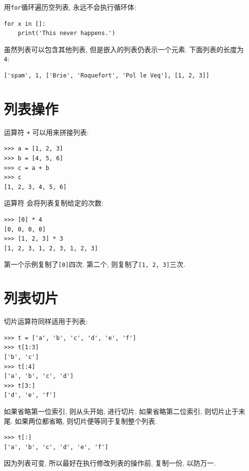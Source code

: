 \documentclass[10pt]{book}
\begin{document}
用{\tt for}循环遍历空列表, 永远不会执行循环体:

\begin{verbatim}
for x in []:
    print('This never happens.')
\end{verbatim}
%
虽然列表可以包含其他列表, 但是嵌入的列表仍表示一个元素. 
下面列表的长度为{\tt 4}:

\begin{verbatim}
['spam', 1, ['Brie', 'Roquefort', 'Pol le Veq'], [1, 2, 3]]
\end{verbatim}



\section{列表操作}

运算符 {\tt +} 可以用来拼接列表:

\begin{verbatim}
>>> a = [1, 2, 3]
>>> b = [4, 5, 6]
>>> c = a + b
>>> c
[1, 2, 3, 4, 5, 6]
\end{verbatim}
%

运算符 {\tt *} 会将列表复制给定的次数:

\begin{verbatim}
>>> [0] * 4
[0, 0, 0, 0]
>>> [1, 2, 3] * 3
[1, 2, 3, 1, 2, 3, 1, 2, 3]
\end{verbatim}
%
第一个示例复制了{\tt [0]}四次. 
第二个, 则复制了{\tt [1, 2, 3]}三次. 


\section{列表切片}

切片运算符同样适用于列表:

\begin{verbatim}
>>> t = ['a', 'b', 'c', 'd', 'e', 'f']
>>> t[1:3]
['b', 'c']
>>> t[:4]
['a', 'b', 'c', 'd']
>>> t[3:]
['d', 'e', 'f']
\end{verbatim}
%
如果省略第一位索引, 则从头开始, 进行切片. 
如果省略第二位索引, 则切片止于末尾. 
如果两位都省略, 则切片便等同于复制整个列表. 

\begin{verbatim}
>>> t[:]
['a', 'b', 'c', 'd', 'e', 'f']
\end{verbatim}
%
因为列表可变, 所以最好在执行修改列表的操作前, 复制一份, 以防万一. 
\end{document}
